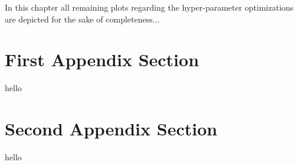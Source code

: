 \appendix
\label{cha:appendix}

In this chapter all remaining plots regarding the hyper-parameter optimizations are depicted for the sake of completeness...


\section{First Appendix Section}

hello

\section{Second Appendix Section}

hello